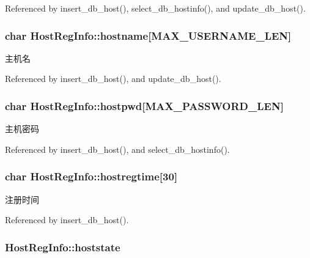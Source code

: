 Referenced by insert\-\_\-db\-\_\-host(), select\-\_\-db\-\_\-hostinfo(), and update\-\_\-db\-\_\-host().

\hypertarget{structHostRegInfo_abaad6f194144e79d59f3f50e7eb078af}{
\subsubsection[{hostname}]{\setlength{\rightskip}{0pt plus 5cm}char Host\-Reg\-Info\-::hostname\mbox{[}{\bf M\-A\-X\-\_\-\-U\-S\-E\-R\-N\-A\-M\-E\-\_\-\-L\-E\-N}\mbox{]}}}\label{structHostRegInfo_abaad6f194144e79d59f3f50e7eb078af}


主机名 



Referenced by insert\-\_\-db\-\_\-host(), and update\-\_\-db\-\_\-host().

\hypertarget{structHostRegInfo_a19bb5479f6700b3eafb505d4cb16bf11}{
\subsubsection[{hostpwd}]{\setlength{\rightskip}{0pt plus 5cm}char Host\-Reg\-Info\-::hostpwd\mbox{[}{\bf M\-A\-X\-\_\-\-P\-A\-S\-S\-W\-O\-R\-D\-\_\-\-L\-E\-N}\mbox{]}}}\label{structHostRegInfo_a19bb5479f6700b3eafb505d4cb16bf11}


主机密码 



Referenced by insert\-\_\-db\-\_\-host(), and select\-\_\-db\-\_\-hostinfo().

\hypertarget{structHostRegInfo_aae80f759cd5835a9b695f2707a1b60e4}{
\subsubsection[{hostregtime}]{\setlength{\rightskip}{0pt plus 5cm}char Host\-Reg\-Info\-::hostregtime\mbox{[}30\mbox{]}}}\label{structHostRegInfo_aae80f759cd5835a9b695f2707a1b60e4}


注册时间 



Referenced by insert\-\_\-db\-\_\-host().

\hypertarget{structHostRegInfo_a6f478e420e2736db1408a6dcd4927e8f}{
\subsubsection[{hoststate}]{ Host\-Reg\-Info\-::hoststate}}\label{structHostRegInfo_a6f478e420e2736db1408a6dcd4927e8f}


